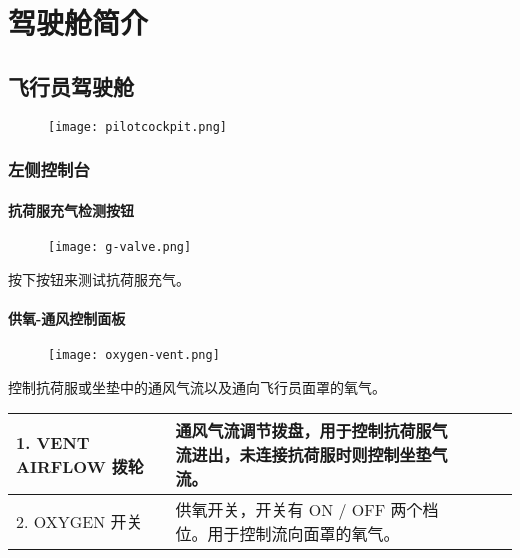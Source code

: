 
\chapter{驾驶舱简介}

\section{飞行员驾驶舱}

\begin{figure}[h]
  \center
  \texttt{[image: pilotcockpit.png]}
\end{figure}

\subsection{左侧控制台}

\subsubsection{抗荷服充气检测按钮}
\begin{figure}[h]
  \center
  \texttt{[image: g-valve.png]}
\end{figure}
按下按钮来测试抗荷服充气。

\subsubsection{供氧-通风控制面板}

\begin{figure}[h]
  \center
  \texttt{[image: oxygen-vent.png]}
\end{figure}
控制抗荷服或坐垫中的通风气流以及通向飞行员面罩的氧气。

\begin{table}[htbp]
  \centering
  \begin{minipage}[t]{0.8\textwidth}
    \begin{tabularx}{\linewidth}{|l|X|X|X|X|}
      \hline
      1. VENT AIRFLOW 拨轮 & 通风气流调节拨盘，用于控制抗荷服气流进出，未连接抗荷服时则控制坐垫气流。\\
      \hline
      2. OXYGEN 开关 & 供氧开关，开关有 ON / OFF 两个档位。用于控制流向面罩的氧气。\\
      \hline
    \end{tabularx}\\[2pt]
  \end{minipage}
\end{table}

